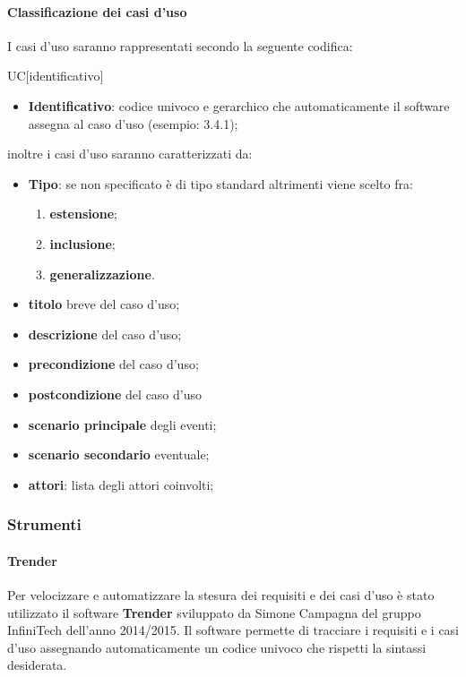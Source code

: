 		\paragraph{Classificazione dei casi d'uso}
		I casi d'uso saranno rappresentati secondo la seguente codifica:
		\begin{center}
			UC[identificativo]
		\end{center}
		\begin{itemize}
			\item \textbf{Identificativo}: codice univoco e gerarchico che automaticamente il software assegna al caso d'uso (esempio: 3.4.1);
		\end{itemize}
		inoltre i casi d'uso saranno caratterizzati da:
		\begin{itemize}
			\item \textbf{Tipo}: se non specificato è di tipo standard altrimenti viene scelto fra:
			\begin{enumerate}
				\item \textbf{estensione};
				\item \textbf{inclusione};
				\item \textbf{generalizzazione}.
			\end{enumerate}
			\item \textbf{titolo} breve del caso d'uso;
			\item \textbf{descrizione} del caso d'uso;
			\item \textbf{precondizione} del caso d'uso;
			\item \textbf{postcondizione} del caso d'uso 
			\item \textbf{scenario principale} degli eventi;
			\item \textbf{scenario secondario} eventuale;
			\item \textbf{attori}: lista degli attori coinvolti;
		\end{itemize}
\subsubsection{Strumenti}
	\paragraph{Trender}
	Per velocizzare e automatizzare la stesura dei requisiti e dei casi d'uso è stato utilizzato il software \textbf{Trender} sviluppato da Simone Campagna del gruppo InfiniTech dell'anno 2014/2015. Il software permette di tracciare i requisiti e i casi d'uso assegnando automaticamente un codice univoco che rispetti la sintassi desiderata.